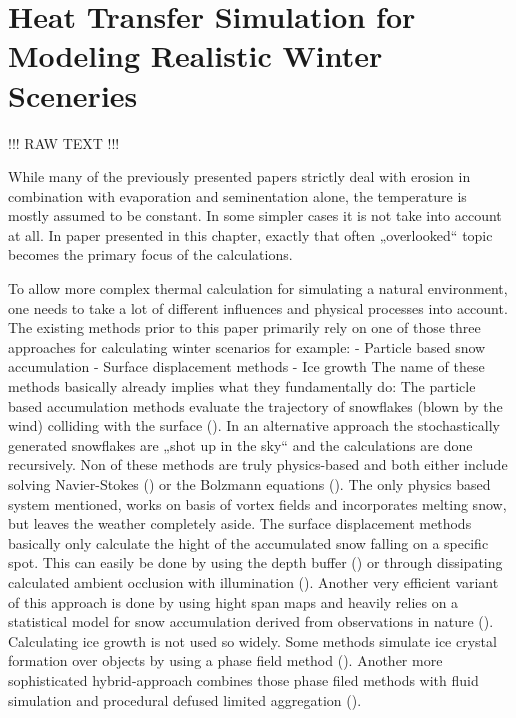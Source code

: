 \section{Heat Transfer Simulation for Modeling Realistic Winter Sceneries}

!!! RAW TEXT !!!

While many of the previously presented papers strictly deal with erosion in combination with evaporation and seminentation alone, the temperature is mostly assumed to be constant. In some simpler cases it is not take into account at all. In paper presented in this chapter, exactly that often „overlooked“ topic becomes the primary focus of the calculations.

To allow more complex thermal calculation for simulating a natural environment, one needs to take a lot of different influences and physical processes into account. The existing methods prior to this paper primarily rely on one of those three approaches for calculating winter scenarios for example:
- Particle based snow accumulation
- Surface displacement methods
- Ice growth
The name of these methods basically already implies what they fundamentally do:
The particle based accumulation methods evaluate the trajectory of snowflakes (blown by the wind) colliding with the surface (). In an alternative approach the stochastically generated snowflakes are „shot up in the sky“ and the calculations are done recursively. Non of these methods are truly physics-based and both either include solving Navier-Stokes () or the Bolzmann equations (). The only physics based system mentioned, works on basis of vortex fields and incorporates melting snow, but leaves the weather completely aside.
The surface displacement methods basically only calculate the hight of the accumulated snow falling on a specific spot. This can easily be done by using the depth buffer () or through dissipating calculated ambient occlusion with illumination (). Another very efficient variant of this approach is done by using hight span maps and heavily relies on a statistical model for snow accumulation derived from observations in nature ().
Calculating ice growth is not used so widely. Some methods simulate ice crystal formation over objects by using a phase field method (). Another more sophisticated hybrid-approach combines those phase filed methods with fluid simulation and procedural defused limited aggregation ().

